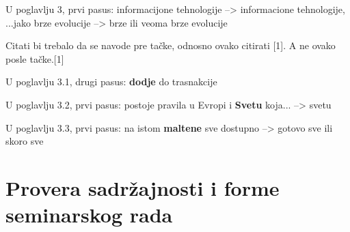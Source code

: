\documentclass[a4paper]{report}
\begin{document}
U poglavlju 3, prvi pasus: informacijone tehnologije --> informacione tehnologije, ...jako brze evolucije --> brze ili veoma brze evolucije

Citati bi trebalo da se navode pre tačke, odnosno ovako citirati [1]. A ne ovako posle tačke.[1] 

U poglavlju 3.1, drugi pasus: \textbf{dodje} do trasnakcije

U poglavlju 3.2, prvi pasus: postoje pravila u Evropi i \textbf{Svetu} koja... --> svetu 

U poglavlju 3.3, prvi pasus: na istom \textbf{maltene} sve dostupno --> gotovo sve ili skoro sve

\section{Provera sadržajnosti i forme seminarskog rada}
\end{document}
